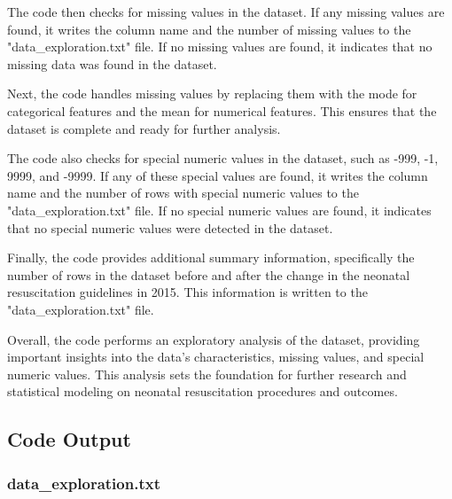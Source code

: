 \documentclass[11pt]{article}
\begin{document}
The code then checks for missing values in the dataset. If any missing values are found, it writes the column name and the number of missing values to the "data\_exploration.txt" file. If no missing values are found, it indicates that no missing data was found in the dataset.

Next, the code handles missing values by replacing them with the mode for categorical features and the mean for numerical features. This ensures that the dataset is complete and ready for further analysis.

The code also checks for special numeric values in the dataset, such as -999, -1, 9999, and -9999. If any of these special values are found, it writes the column name and the number of rows with special numeric values to the "data\_exploration.txt" file. If no special numeric values are found, it indicates that no special numeric values were detected in the dataset.

Finally, the code provides additional summary information, specifically the number of rows in the dataset before and after the change in the neonatal resuscitation guidelines in 2015. This information is written to the "data\_exploration.txt" file.

Overall, the code performs an exploratory analysis of the dataset, providing important insights into the data's characteristics, missing values, and special numeric values. This analysis sets the foundation for further research and statistical modeling on neonatal resuscitation procedures and outcomes.

\subsection{Code Output}

\subsubsection*{data\_exploration.txt}
\end{document}
